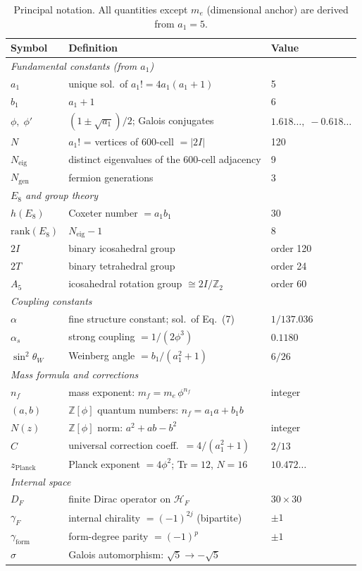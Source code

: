 \documentclass[12pt,a4paper]{article}
\theoremstyle{definition}
\begin{document}
\begin{table}[H]
\centering\small
\begin{tabular}{lll}
\toprule
\textbf{Symbol} & \textbf{Definition} & \textbf{Value} \\
\midrule
\multicolumn{3}{l}{\textit{Fundamental constants (from $a_1$)}} \\
$a_1$ & unique sol.\ of $a_1! = 4a_1(a_1+1)$ & 5 \\
$b_1$ & $a_1 + 1$ & 6 \\
$\phi,\;\phi'$ & $(1 \pm \sqrt{a_1})/2$; Galois conjugates & $1.618\ldots,\; {-}0.618\ldots$ \\
$N$ & $a_1!$ = vertices of 600-cell $= |2I|$ & 120 \\
$N_{\text{eig}}$ & distinct eigenvalues of the 600-cell adjacency & 9 \\
$N_{\text{gen}}$ & fermion generations & 3 \\
\midrule
\multicolumn{3}{l}{\textit{$E_8$ and group theory}} \\
$h(E_8)$ & Coxeter number $= a_1 b_1$ & 30 \\
$\text{rank}(E_8)$ & $N_{\text{eig}} - 1$ & 8 \\
$2I$ & binary icosahedral group & order 120 \\
$2T$ & binary tetrahedral group & order 24 \\
$A_5$ & icosahedral rotation group $\cong 2I/\mathbb{Z}_2$ & order 60 \\
\midrule
\multicolumn{3}{l}{\textit{Coupling constants}} \\
$\alpha$ & fine structure constant; sol.\ of Eq.~(7) & $1/137.036$ \\
$\alpha_s$ & strong coupling $= 1/(2\phi^3)$ & $0.1180$ \\
$\sin^2\!\theta_W$ & Weinberg angle $= b_1/(a_1^2+1)$ & $6/26$ \\
\midrule
\multicolumn{3}{l}{\textit{Mass formula and corrections}} \\
$n_f$ & mass exponent: $m_f = m_e\,\phi^{n_f}$ & integer \\
$(a,b)$ & $\mathbb{Z}[\phi]$ quantum numbers: $n_f = a_1 a + b_1 b$ & \\
$N(z)$ & $\mathbb{Z}[\phi]$ norm: $a^2 + ab - b^2$ & integer \\
$C$ & universal correction coeff.\ $= 4/(a_1^2+1)$ & $2/13$ \\
$z_{\text{Planck}}$ & Planck exponent $= 4\phi^2$; Tr$=12$, $N=16$ & $10.472\ldots$ \\
\midrule
\multicolumn{3}{l}{\textit{Internal space}} \\
$D_F$ & finite Dirac operator on $\mathcal{H}_F$ & $30 \times 30$ \\
$\gamma_F$ & internal chirality $= (-1)^{2j}$ (bipartite) & $\pm 1$ \\
$\gamma_{\text{form}}$ & form-degree parity $= (-1)^p$ & $\pm 1$ \\
$\sigma$ & Galois automorphism: $\sqrt{5} \to -\sqrt{5}$ & \\
\bottomrule
\end{tabular}
\caption{Principal notation.  All quantities except $m_e$ (dimensional anchor) are derived from $a_1 = 5$.}
\label{tab:S-notation}
\end{table}
\end{document}
